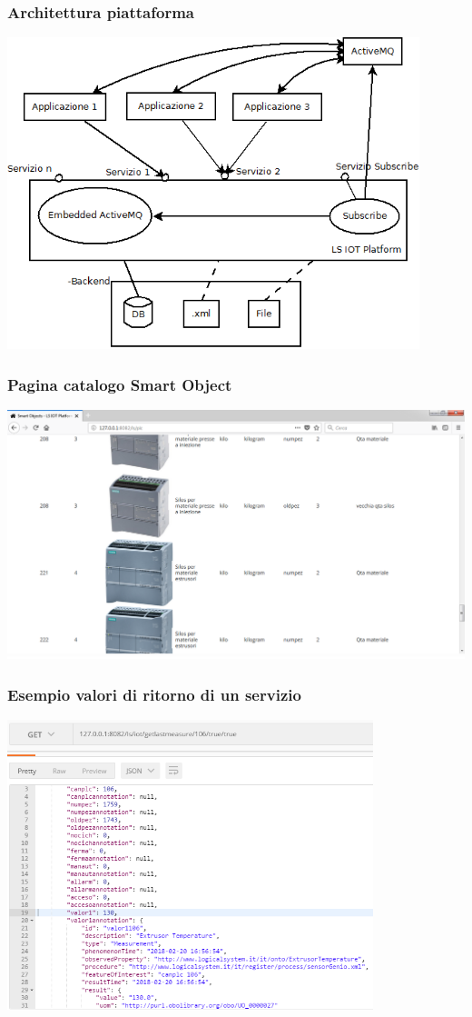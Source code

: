 \documentclass{beamer}
\begin{document}
\begin{frame}
\frametitle{Architettura piattaforma}
\includegraphics[width=0.9\textwidth]{images/architettura_piattaforma.png}
\end{frame}

\begin{frame}
\frametitle{Pagina catalogo Smart Object}
\includegraphics[width=1\textwidth]{images/SmartObjectsPlatform.png}
\end{frame}

\begin{frame}
\frametitle{Esempio valori di ritorno di un servizio}
\includegraphics[width=0.8\textwidth]{images/Postman1-corretto.png}
\end{frame}
\end{document}
